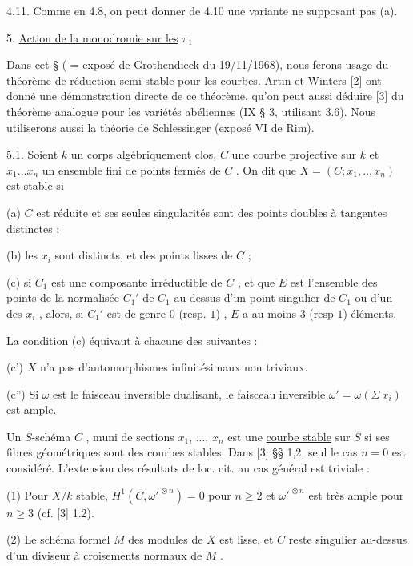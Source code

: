 4.11.  Comme en 4.8, on peut donner de 4.10 une variante ne supposant pas (a).



5.  \underline{Action de la monodromie sur les}  $\pi_1$

Dans cet § ( = exposé de Grothendieck du 19/11/1968), nous ferons usage du théorème de réduction semi-stable pour les courbes. Artin et Winters [2] ont donné une démonstration directe de ce théorème, qu'on peut aussi déduire [3] du théorème analogue pour les variétés abéliennes (IX § 3, utilisant 3.6). Nous utiliserons aussi la théorie de  Schlessinger (exposé VI de  Rim).

5.1.  Soient  $k$  un corps algébriquement clos, $C$ une courbe projective sur  $k$  et $x_1 \ldots x_n$  un ensemble fini de points fermés de  $C$ . On dit que  $X = (C ; x_1,.., x_n)$ est \underline{stable} si

(a) $C$ est réduite et ses seules singularités sont des points doubles à tangentes distinctes ;

(b) les  $x_i$  sont distincts, et des points lisses de  $C$ ;

(c) si  $C_1$  est une composante irréductible de  $C$ , et que  $E$  est l'ensemble des points de la normalisée  $C_1'$  de  $C_1$  au-dessus d'un point singulier de  $C_1$  ou d'un des  $x_i$ , alors, si  $C_1'$  est de genre  $0$  (resp. $1$) ,  $E$  a au moins  $3$ (resp $1$) éléments.

La condition (c) équivaut à chacune des suivantes :

(c')  $X$  n'a pas d'automorphismes infinitésimaux non triviaux.

(c'')  Si  $\omega$  est le faisceau inversible dualisant, le faisceau inversible $\omega' = \omega(\Sigma\ x_i)$  est ample.

Un  $S$-schéma  $C$ , muni de sections  $x_1$, ...,  $x_n$  est une \underline{courbe stable}  sur $S$  si ses fibres géométriques sont des courbes stables. Dans [3] §§ 1,2, seul le cas $n = 0$  est considéré. L'extension des résultats de loc. cit. au cas général est triviale :

(1) Pour  $X/k$  stable,  $H^1(C,\omega'^{\,\otimes n}) = 0$  pour  $n \geqslant 2$  et  $\omega'^{\,\otimes n}$  est très ample pour  $n \geqslant 3$  (cf. [3] 1.2).

(2) Le schéma formel  $M$  des modules de  $X$  est lisse, et  $C$  reste singulier au-dessus d'un diviseur à croisements normaux de  $M$ .


